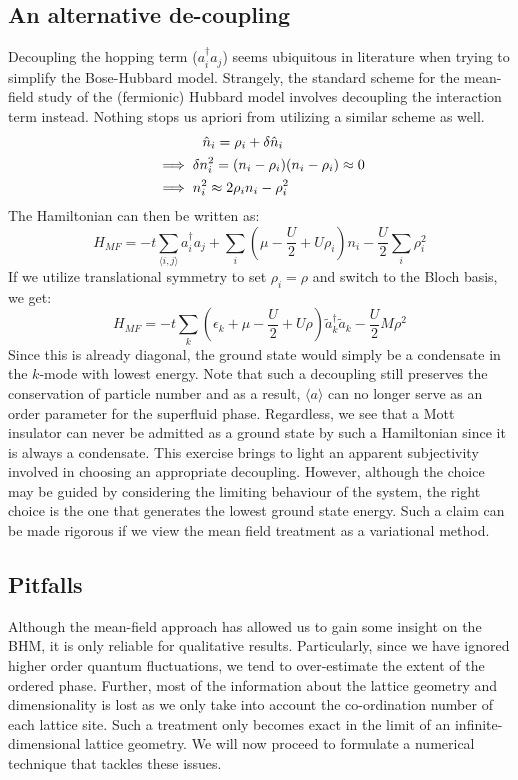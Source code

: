\subsection{An alternative de-coupling}
Decoupling the hopping term ($a_i^{\dagger}a_j$) seems ubiquitous in literature when trying to simplify the Bose-Hubbard model. Strangely, the standard scheme for the mean-field study of the (fermionic) Hubbard model involves decoupling the interaction term instead. Nothing stops us apriori from utilizing a similar scheme as well. 
\begin{align}
    &\hspace{1.2cm}\hat{n}_i = \rho_i + \delta \hat{n}_i \nonumber\\
    &\implies \delta n_i^2 = (n_i - \rho_i)(n_i - \rho_i) \approx 0 \nonumber\\
    &\implies n_i^2 \approx 2\rho_i n_i - \rho_i^2
\end{align}
The Hamiltonian can then be written as:
\begin{equation}
    H_{MF} = -t\sum_{\langle i, j \rangle} a_i^{\dagger} a_j + \sum_i \left( \mu - \frac{U}{2} + U\rho_i\right) n_i - \frac{U}{2}\sum_i \rho_i^2
\end{equation}
If we utilize translational symmetry to set $\rho_i = \rho$ and switch to the Bloch basis, we get:
\begin{equation}
    H_{MF} = -t\sum_{k} \left(\epsilon_k + \mu - \frac{U}{2} + U\rho\right) \tilde{a}_k^{\dagger} \tilde{a}_k - \frac{U}{2}M\rho^2
\end{equation}
Since this is already diagonal, the ground state would simply be a condensate in the $k$-mode with lowest energy. Note that such a decoupling still preserves the conservation of particle number and as a result, $\langle a \rangle$ can no longer serve as an order parameter for the superfluid phase. Regardless, we see that a Mott insulator can never be admitted as a ground state by such a Hamiltonian since it is always a condensate. This exercise brings to light an apparent subjectivity involved in choosing an appropriate decoupling. However, although the choice may be guided by considering the limiting behaviour of the system, the right choice is the one that generates the lowest ground state energy. Such a claim can be made rigorous if we view the mean field treatment as a variational method\cite{sachdev_2011}.

\subsection{Pitfalls}
Although the mean-field approach has allowed us to gain some insight on the BHM, it is only reliable for qualitative results. Particularly, since we have ignored higher order quantum fluctuations, we tend to over-estimate the extent of the ordered phase. Further, most of the information about the lattice geometry and dimensionality is lost as we only take into account the co-ordination number of each lattice site. Such a treatment only becomes exact in the limit of an infinite-dimensional lattice geometry. We will now proceed to formulate a numerical technique that tackles these issues.

